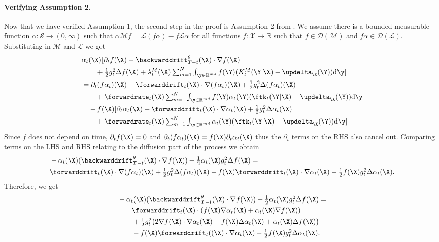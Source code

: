 \paragraph{Verifying Assumption 2.} Now that we have verified Assumption 1, the
second step in the proof is Assumption 2 from \cite{benton2022denoising}. We
assume there is a bounded measurable function
$\alpha : \mathcal{S} \rightarrow (0, \infty)$ such that
$\alpha \mathcal{M} f = \mathcal{L}(f \alpha) - f \mathcal{L}\alpha$ for all
functions $f : \mathcal{X} \rightarrow \mathbb{R}$ such that
$f \in \mathcal{D}(\mathcal{M})$ and $f \alpha \in
\mathcal{D}(\mathcal{L})$. Substituting in $\mathcal{M}$ and $\mathcal{L}$ we
get
\begin{align}
  &\textstyle \alpha_t(\X) [ \partial_t f(\X) - \backwarddrift_{T-t}^\theta(\X) \cdot \nabla f(\X) \\
  & \qquad \textstyle + \frac{1}{2} g_{t}^2 \Delta f(\X) + \mrate_t(\X) \inty f(\Y) ( \mtk_t(\Y | \X) - \updelta_{\X}(\Y) ) \rmd \y ]\\
  &\textstyle = \partial_t( f \alpha_t) (\X) + \forwarddrift_t(\X) \cdot \nabla (f \alpha_t)(\X) + \frac{1}{2} g_t^2 \Delta (f \alpha_t) (\X)\\
  & \qquad \textstyle + \forwardrate_t(\X) \inty f(\Y) \alpha_t(\Y) ( \ftk_t(\Y | \X) - \updelta_{\X}(\Y) ) \rmd \y\\
  &\textstyle  \quad - f(\X) [ \partial_t \alpha_t(\X) + \forwarddrift_t(\X) \cdot \nabla \alpha_t(\X) + \frac{1}{2} g_t^2 \Delta \alpha_t (\X) \\
  & \qquad \textstyle + \forwardrate_t(\X) \inty \alpha_t(\Y) ( \ftk_t(\Y | \X) - \updelta_{\X}(\Y) ) \rmd \y ] 
    \label{eq:assm2equality}
\end{align}
Since $f$ does not depend on time, $\partial_t f(\X) = 0$ and $\partial_t(f \alpha_t) (\X) = f(\X) \partial_t \alpha_t (\X)$ thus the $\partial_t$ terms on the RHS also cancel out. Comparing terms on the LHS and RHS relating to the diffusion part of the process we obtain
\begin{align}
    &\textstyle - \alpha_t(\X) ( \backwarddrift_{T-t}^\theta(\X) \cdot \nabla f(\X)) + \frac{1}{2} \alpha_t(\X) g_t^2 \Delta f(\X) = \\
    &\textstyle \forwarddrift_t(\X) \cdot \nabla(f \alpha_t) (\X) + \frac{1}{2} g_t^2 \Delta (f \alpha_t) (\X) - f(\X) \forwarddrift_t(\X) \cdot \nabla \alpha_t(\X) - \frac{1}{2} f(\X) g_t^2 \Delta \alpha_t(\X) . 
\end{align}
Therefore, we get 
\begin{align}
    &\textstyle -\alpha_t(\X) (\backwarddrift_{T-t}^\theta(\X) \cdot \nabla f(\X)) + \frac{1}{2} \alpha_t(\X) g_t^2 \Delta f(\X) = \\
    &\textstyle  \quad \quad \forwarddrift_t(\X) \cdot ( f(\X) \nabla \alpha_t(\X) + \alpha_t(\X) \nabla f(\X)) \\
  &\textstyle \quad \quad + \frac{1}{2} g_t^2 \big( 2 \nabla f(\X) \cdot \nabla \alpha_t(\X) +f(\X) \Delta \alpha_t(\X) + \alpha_t (\X) \Delta f(\X) \big) \\
    &\textstyle  \quad \quad - f(\X) \forwarddrift_t((\X) \cdot \nabla \alpha_t(\X) - \frac{1}{2} f(\X) g_t^2 \Delta \alpha_t(\X) . 
\end{align}
